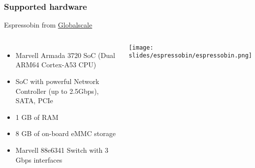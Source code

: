\begin{frame}
\frametitle{Supported hardware}
  Espressobin from 
\href{https://espressobin.net/}{Globalscale}
  \begin{columns}
    \footnotesize
    \begin{itemize}
      \item Marvell Armada 3720 SoC (Dual ARM64 Cortex-A53 CPU)
      \item SoC with powerful Network Controller (up to 2.5Gbps), SATA, PCIe
      \item 1 GB of RAM
      \item 8 GB of on-board eMMC storage
      \item Marvell 88e6341 Switch with 3 Gbps interfaces
    \end{itemize}
    \begin{center}
      \texttt{[image: slides/espressobin/espressobin.png]}
    \end{center}
  \end{columns}
\end{frame}
